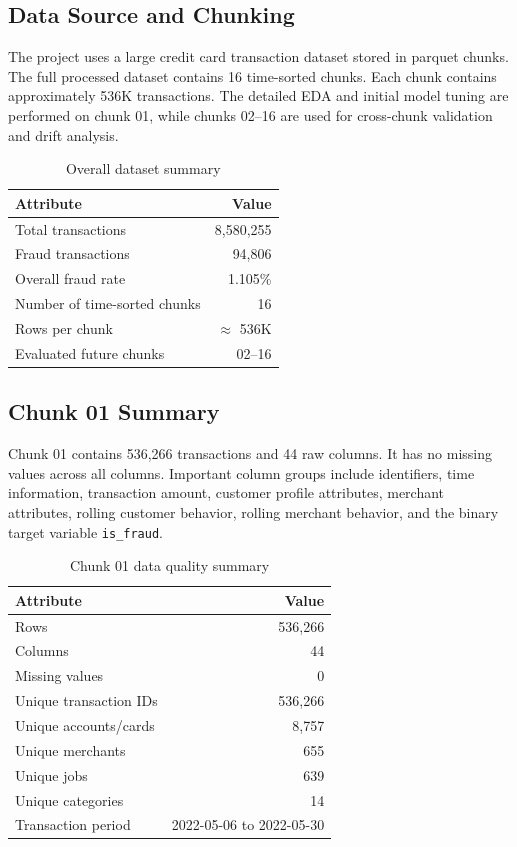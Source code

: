 \documentclass[12pt,a4paper,twoside]{article}
\begin{document}
\subsection{Data Source and Chunking}

The project uses a large credit card transaction dataset stored in parquet chunks. The full processed dataset contains 16 time-sorted chunks. Each chunk contains approximately 536K transactions. The detailed EDA and initial model tuning are performed on chunk 01, while chunks 02--16 are used for cross-chunk validation and drift analysis.

\begin{table}[H]
\centering
\caption{Overall dataset summary}
\begin{tabular}{lr}
\toprule
\textbf{Attribute} & \textbf{Value} \\
\midrule
Total transactions & 8,580,255 \\
Fraud transactions & 94,806 \\
Overall fraud rate & 1.105\% \\
Number of time-sorted chunks & 16 \\
Rows per chunk & $\approx$ 536K \\
Evaluated future chunks & 02--16 \\
\bottomrule
\end{tabular}
\end{table}

\subsection{Chunk 01 Summary}

Chunk 01 contains 536,266 transactions and 44 raw columns. It has no missing values across all columns. Important column groups include identifiers, time information, transaction amount, customer profile attributes, merchant attributes, rolling customer behavior, rolling merchant behavior, and the binary target variable \texttt{is\_fraud}.

\begin{table}[H]
\centering
\caption{Chunk 01 data quality summary}
\begin{tabular}{lr}
\toprule
\textbf{Attribute} & \textbf{Value} \\
\midrule
Rows & 536,266 \\
Columns & 44 \\
Missing values & 0 \\
Unique transaction IDs & 536,266 \\
Unique accounts/cards & 8,757 \\
Unique merchants & 655 \\
Unique jobs & 639 \\
Unique categories & 14 \\
Transaction period & 2022-05-06 to 2022-05-30 \\
\bottomrule
\end{tabular}
\end{table}
\end{document}
